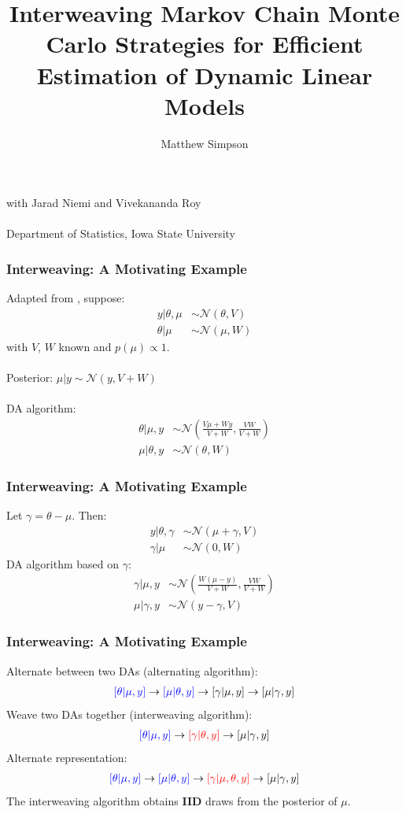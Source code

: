 \documentclass[xcolor=dvipsnames]{beamer}
\title[Interweaving MCMC Strats for DLMs]{Interweaving Markov Chain Monte Carlo Strategies for Efficient
Estimation of Dynamic Linear Models}
\author[M. Simpson]{Matthew Simpson}
\date{}
\institute[Deps of Stat \& Econ, ISU]{Departments of Statistics and Economics, Iowa State University}
\newcommand\N{\mathcal{N}}
\begin{document}
\begin{frame}
\titlepage
\begin{center}
with Jarad Niemi and Vivekananda Roy\\~\\
\scriptsize{Department of Statistics, Iowa State University}
\end{center}
\end{frame}

\begin{frame}
\frametitle{Interweaving: A Motivating Example}
Adapted from \citet{yu2011center}, suppose:
\begin{align*}
y|\theta, \mu & \sim \N(\theta, V) \\
\theta|\mu & \sim \N(\mu, W) 
\end{align*}
with $V$, $W$ known and $p(\mu)\propto 1$.\\~\\
Posterior: $\mu|y \sim \N(y, V+W)$\\~\\
DA algorithm:
\begin{align*}
\theta|\mu,y &\sim \N\left(\frac{V\mu + Wy}{V+W}, \frac{VW}{V+W}\right)\\
\mu |\theta, y &\sim \N(\theta, W)
\end{align*}
\end{frame}

\begin{frame}
\frametitle{Interweaving: A Motivating Example}
Let $\gamma = \theta - \mu$. Then:
\begin{align*}
y|\theta, \gamma & \sim \N(\mu + \gamma, V) \\
\gamma|\mu & \sim \N(0, W) 
\end{align*}
DA algorithm based on $\gamma$:
\begin{align*}
\gamma|\mu,y &\sim \N\left(\frac{W(\mu - y)}{V+W}, \frac{VW}{V+W}\right)\\
\mu |\gamma, y &\sim \N(y-\gamma, V)
\end{align*}
\end{frame}

\begin{frame}
\frametitle{Interweaving: A Motivating Example}
Alternate between two DAs (alternating algorithm):
\begin{align*}
{\color{blue}[\theta|\mu,y]} \to {\color{blue}[\mu|\theta,y]} \to [\gamma|\mu,y] \to [\mu|\gamma,y]
\end{align*}
Weave two DAs together (interweaving algorithm):
\begin{align*}
{\color{blue}[\theta|\mu,y]} \to {\color{red}[\gamma|\theta,y]} \to [\mu|\gamma,y]
\end{align*}
Alternate representation:
\begin{align*}
{\color{blue}[\theta|\mu,y]} \to {\color{blue}[\mu|\theta,y]} \to {\color{red}[\gamma|\mu,\theta,y]} \to [\mu|\gamma,y]
\end{align*}
The interweaving algorithm obtains {\bf IID} draws from the posterior of $\mu$.
\end{frame}
\end{document}
